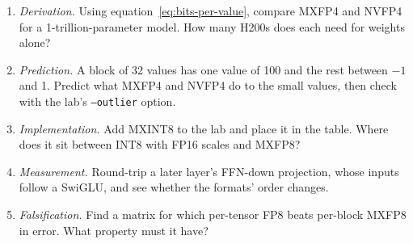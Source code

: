 \ExercisesSection

\begin{enumerate}
\item \emph{Derivation.} Using equation~\eqref{eq:bits-per-value}, compare
MXFP4 and NVFP4 for a 1-trillion-parameter model. How many H200s does each
need for weights alone?
\item \emph{Prediction.} A block of 32 values has one value of 100 and the
rest between $-1$ and 1. Predict what MXFP4 and NVFP4 do to the small values,
then check with the lab's \texttt{--outlier} option.
\item \emph{Implementation.} Add MXINT8 to the lab and place it in the table.
Where does it sit between INT8 with FP16 scales and MXFP8?
\item \emph{Measurement.} Round-trip a later layer's FFN-down projection, whose
inputs follow a SwiGLU, and see whether the formats' order changes.
\item \emph{Falsification.} Find a matrix for which per-tensor FP8 beats
per-block MXFP8 in error. What property must it have?
\end{enumerate}


